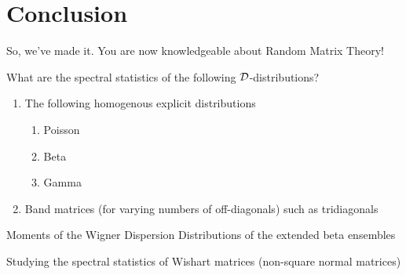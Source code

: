
  \chapter*{Conclusion}

\medskip

So, we've made it. You are now knowledgeable about Random Matrix Theory!


\medskip
 What are the spectral statistics of the following $\mathcal{D}$-distributions?

\begin{enumerate}
  \item The following homogenous explicit distributions
    \begin{enumerate}
      \item Poisson
      \item Beta
      \item Gamma
    \end{enumerate}
  \item Band matrices (for varying numbers of off-diagonals) such as tridiagonals
\end{enumerate}

\medskip
 Moments of the Wigner Dispersion Distributions of the extended beta ensembles




\medskip
 Studying the spectral statistics of Wishart matrices (non-square normal matrices)
